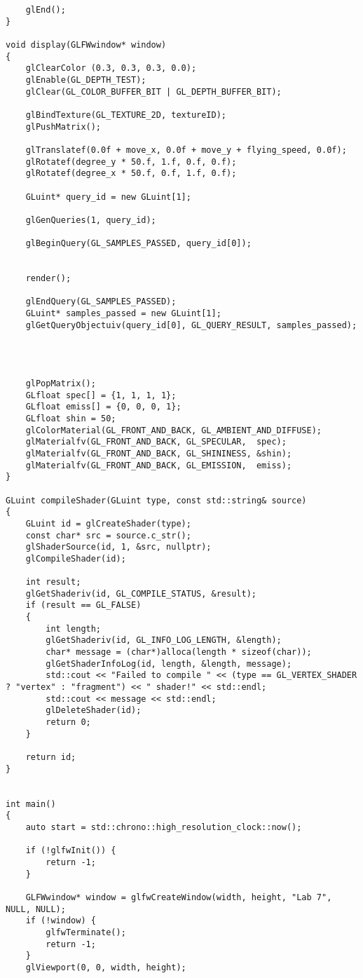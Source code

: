 \documentclass[a4paper, 14pt]{extarticle}
\begin{document}
\begin{verbatim}
    glEnd();
}

void display(GLFWwindow* window)
{
    glClearColor (0.3, 0.3, 0.3, 0.0);
    glEnable(GL_DEPTH_TEST);
    glClear(GL_COLOR_BUFFER_BIT | GL_DEPTH_BUFFER_BIT);

    glBindTexture(GL_TEXTURE_2D, textureID);
    glPushMatrix();

    glTranslatef(0.0f + move_x, 0.0f + move_y + flying_speed, 0.0f);
    glRotatef(degree_y * 50.f, 1.f, 0.f, 0.f);
    glRotatef(degree_x * 50.f, 0.f, 1.f, 0.f);

    GLuint* query_id = new GLuint[1];

    glGenQueries(1, query_id);

    glBeginQuery(GL_SAMPLES_PASSED, query_id[0]);


    render();

    glEndQuery(GL_SAMPLES_PASSED);
    GLuint* samples_passed = new GLuint[1];
    glGetQueryObjectuiv(query_id[0], GL_QUERY_RESULT, samples_passed);


    

    glPopMatrix();
    GLfloat spec[] = {1, 1, 1, 1};
    GLfloat emiss[] = {0, 0, 0, 1};
    GLfloat shin = 50;
    glColorMaterial(GL_FRONT_AND_BACK, GL_AMBIENT_AND_DIFFUSE);
    glMaterialfv(GL_FRONT_AND_BACK, GL_SPECULAR,  spec);
    glMaterialfv(GL_FRONT_AND_BACK, GL_SHININESS, &shin);
    glMaterialfv(GL_FRONT_AND_BACK, GL_EMISSION,  emiss);
}

GLuint compileShader(GLuint type, const std::string& source)
{
    GLuint id = glCreateShader(type);
    const char* src = source.c_str();
    glShaderSource(id, 1, &src, nullptr);
    glCompileShader(id);

    int result;
    glGetShaderiv(id, GL_COMPILE_STATUS, &result);
    if (result == GL_FALSE)
    {
        int length;
        glGetShaderiv(id, GL_INFO_LOG_LENGTH, &length);
        char* message = (char*)alloca(length * sizeof(char));
        glGetShaderInfoLog(id, length, &length, message);
        std::cout << "Failed to compile " << (type == GL_VERTEX_SHADER ? "vertex" : "fragment") << " shader!" << std::endl;
        std::cout << message << std::endl;
        glDeleteShader(id);
        return 0;
    }

    return id;
}


int main()
{
    auto start = std::chrono::high_resolution_clock::now();

    if (!glfwInit()) {
        return -1;
    }

    GLFWwindow* window = glfwCreateWindow(width, height, "Lab 7", NULL, NULL);
    if (!window) {
        glfwTerminate();
        return -1;
    }
    glViewport(0, 0, width, height);


\end{verbatim}
\end{document}
